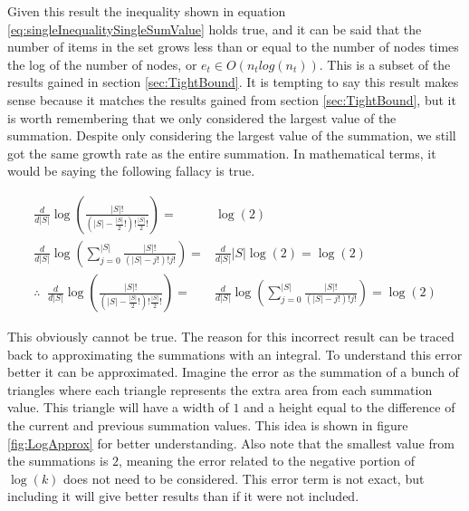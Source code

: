 \documentclass{article}
\begin{document}
Given this result the inequality shown in equation \ref{eq:singleInequalitySingleSumValue} holds true, and it can be said that the number of items in the set grows less than or equal to the number of nodes times the log of the number of nodes, or $e_t\in O(n_tlog(n_t))$. This is a subset of the results gained in section \ref{sec:TightBound}. It is tempting to say this result makes sense because it matches the results gained from section \ref{sec:TightBound}, but it is worth remembering that we only considered the largest value of the summation. Despite only considering the largest value of the summation, we still got the same growth rate as the entire summation. In mathematical terms, it would be saying the following fallacy is true.

\begin{equation*}
	\begin{split}
		\frac{d}{d|S|}				
		\log \left( \frac{
			|S|!
		}{
			\left(|S|-\frac{|S|}{2}!\right)!\frac{|S|}{2}!
		} \right)
		= &
		\log(2)
		\\
		\frac{d}{d|S|}				
		\log \left( \sum_{j=0}^{|S|} \frac{
			|S|!
		}{
			\left(|S|-j!\right)!j!
		} \right)
		= &
		\frac{d}{d|S|} |S|\log(2)=\log(2)
		\\
		\therefore  \;\;
		\frac{d}{d|S|}				
		\log \left( \frac{
			|S|!
		}{
			\left(|S|-\frac{|S|}{2}!\right)!\frac{|S|}{2}!
		} \right)
		= &
		\frac{d}{d|S|}				
		\log \left( \sum_{j=0}^{|S|} \frac{
			|S|!
		}{
			\left(|S|-j!\right)!j!
		} \right)
		=\log(2)
	\end{split}	
\end{equation*}

This obviously cannot be true. The reason for this incorrect result can be traced back to approximating the summations with an integral. To understand this error better it can be approximated. Imagine the error as the summation of a bunch of triangles where each triangle represents the extra area from each summation value. This triangle will have a width of $1$ and a height equal to the difference of the current and previous summation values. This idea is shown in figure \ref{fig:LogApprox} for better understanding. Also note that the smallest value from the summations is $2$, meaning the error related to the negative portion of $\log(k)$ does not need to be considered. This error term is not exact, but including it will give better results than if it were not included.
\end{document}
